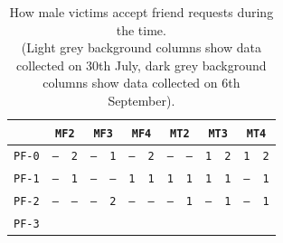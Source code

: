 \begin{table}[H]
	\centering
	\caption{How male victims accept friend requests during the time. \\ (Light grey background columns show data collected on 30th July, dark grey background columns show data collected on 6th September).}
	\label{table:male-accept}
	\begin{tabular}[c]{ |c|c|c|c|c|c|c|c|c|c|c|c|c| } 
		\hline
		\backslashbox{\phantom{"}}{\phantom{"}} &   			
		\multicolumn{2}{|c|}{\cellcolor[HTML]{FFFFFF}\texttt{MF2}} & 
		\multicolumn{2}{|c|}{\cellcolor[HTML]{FFFFFF}\texttt{MF3}} &
		\multicolumn{2}{|c|}{\cellcolor[HTML]{FFFFFF}\texttt{MF4}} & 
		\multicolumn{2}{|c|}{\cellcolor[HTML]{FFFFFF}\texttt{MT2}} & 
		\multicolumn{2}{|c|}{\cellcolor[HTML]{FFFFFF}\texttt{MT3}} &
		\multicolumn{2}{|c|}{\cellcolor[HTML]{FFFFFF}\texttt{MT4}} \\
		\hline 
		\cellcolor[HTML]{FFFFFF}\texttt{PF-0} & 
		\cellcolor[HTML]{F5F5F5}\texttt{--} & \cellcolor[HTML]{D3D3D3}\texttt{2} &
		\cellcolor[HTML]{F5F5F5}\texttt{--} & \cellcolor[HTML]{D3D3D3}\texttt{1} &
		\cellcolor[HTML]{F5F5F5}\texttt{--} & \cellcolor[HTML]{D3D3D3}\texttt{2} & 
		\cellcolor[HTML]{F5F5F5}\texttt{--} & \cellcolor[HTML]{D3D3D3}\texttt{--} &
		\cellcolor[HTML]{F5F5F5}\texttt{1} & \cellcolor[HTML]{D3D3D3}\texttt{2} &
		\cellcolor[HTML]{F5F5F5}\texttt{1} & \cellcolor[HTML]{D3D3D3}\texttt{2} \\
		\hline 
		\cellcolor[HTML]{FFFFFF}\texttt{PF-1} & 
		\cellcolor[HTML]{F5F5F5}\texttt{--} & \cellcolor[HTML]{D3D3D3}\texttt{1} &
		\cellcolor[HTML]{F5F5F5}\texttt{--} & \cellcolor[HTML]{D3D3D3}\texttt{--} &
		\cellcolor[HTML]{F5F5F5}\texttt{1} & \cellcolor[HTML]{D3D3D3}\texttt{1} & 
		\cellcolor[HTML]{F5F5F5}\texttt{1} & \cellcolor[HTML]{D3D3D3}\texttt{1} &
		\cellcolor[HTML]{F5F5F5}\texttt{1} & \cellcolor[HTML]{D3D3D3}\texttt{1} &
		\cellcolor[HTML]{F5F5F5}\texttt{--} & \cellcolor[HTML]{D3D3D3}\texttt{1} \\
		\hline 
		\cellcolor[HTML]{FFFFFF}\texttt{PF-2} & 
		\cellcolor[HTML]{F5F5F5}\texttt{--} & \cellcolor[HTML]{D3D3D3}\texttt{--} &
		\cellcolor[HTML]{F5F5F5}\texttt{--} & \cellcolor[HTML]{D3D3D3}\texttt{2} &
		\cellcolor[HTML]{F5F5F5}\texttt{--} & \cellcolor[HTML]{D3D3D3}\texttt{--} & 
		\cellcolor[HTML]{F5F5F5}\texttt{--} & \cellcolor[HTML]{D3D3D3}\texttt{1} &
		\cellcolor[HTML]{F5F5F5}\texttt{--} & \cellcolor[HTML]{D3D3D3}\texttt{1} &
		\cellcolor[HTML]{F5F5F5}\texttt{--} & \cellcolor[HTML]{D3D3D3}\texttt{1} \\
		\hline 
		\cellcolor[HTML]{FFFFFF}\texttt{PF-3} & 

\end{tabular}
\end{table}
